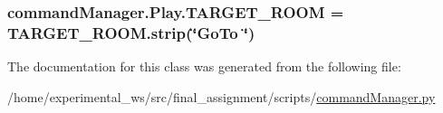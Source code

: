 \subsubsection[{\texorpdfstring{T\+A\+R\+G\+E\+T\+\_\+\+R\+O\+OM}{TARGET_ROOM}}]{\setlength{\rightskip}{0pt plus 5cm}command\+Manager.\+Play.\+T\+A\+R\+G\+E\+T\+\_\+\+R\+O\+OM = T\+A\+R\+G\+E\+T\+\_\+\+R\+O\+O\+M.\+strip(\char`\"{}Go\+To \char`\"{})\hspace{0.3cm}{\ttfamily [static]}}\hypertarget{classcommandManager_1_1Play_a4279053c8c702e0fcbc425efcd2b207c}{}\label{classcommandManager_1_1Play_a4279053c8c702e0fcbc425efcd2b207c}


The documentation for this class was generated from the following file\+:\begin{DoxyCompactItemize}
\item 
/home/experimental\+\_\+ws/src/final\+\_\+assignment/scripts/\hyperlink{commandManager_8py}{command\+Manager.\+py}\end{DoxyCompactItemize}
